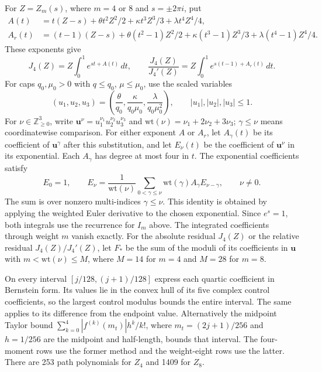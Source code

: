 \documentclass[11pt,reqno]{amsart}
\numberwithin{equation}{section}
\theoremstyle{definition}
\theoremstyle{remark}
\begin{document}
For $Z=Z_m(s)$, where $m=4$ or $8$ and $s=\pm2\pi i$, put
\begin{align*}
 A(t)&=t(Z-s)+\theta t^2 Z^2/2+\kappa t^3Z^3/3+\lambda t^4Z^4/4,\\
 A_r(t)&=(t-1)(Z-s)+\theta(t^2-1)Z^2/2
                  +\kappa(t^3-1)Z^3/3+\lambda(t^4-1)Z^4/4.
\end{align*}
These exponents give
\[
 J_4(Z)=Z\int_0^1e^{st+A(t)}\,dt,\qquad
 \frac{J_4(Z)}{J_4'(Z)}
 =Z\int_0^1e^{s(t-1)+A_r(t)}\,dt.
\]
For caps $q_0,\mu_0>0$ with $q\le q_0$, $\mu\le\mu_0$, use
the scaled variables
\[
 (u_1,u_2,u_3)=
 \left(\frac{\theta}{q_0},\frac{\kappa}{q_0\mu_0},
                         \frac{\lambda}{q_0\mu_0^2}\right),
 \qquad |u_1|,|u_2|,|u_3|\le1.
\]
For $\nu\in\mathbb Z_{\ge0}^3$, write
$\mathbf u^\nu=u_1^{\nu_1}u_2^{\nu_2}u_3^{\nu_3}$ and
$\mathrm{wt}(\nu)=\nu_1+2\nu_2+3\nu_3$; $\gamma\le\nu$ means
coordinatewise comparison. For either exponent $A$ or $A_r$, let
$A_\gamma(t)$ be its coefficient of $\mathbf u^\gamma$ after this
substitution, and let $E_\nu(t)$ be the coefficient of $\mathbf u^\nu$
in its exponential. Each $A_\gamma$ has degree at most four in $t$.
The exponential coefficients satisfy
\begin{equation}\label{lt:euler-recursion}
 E_0=1,\qquad
 E_\nu=\frac1{\mathrm{wt}(\nu)}
       \sum_{0<\gamma\le\nu}\mathrm{wt}(\gamma)A_\gamma E_{\nu-\gamma},
 \qquad \nu\ne0.
\end{equation}
The sum is over nonzero multi-indices $\gamma\le\nu$.
This identity is obtained by applying the weighted Euler derivative to
the chosen exponential. Since $e^s=1$, both integrals use the recurrence
for $I_m$ above. The integrated coefficients through weight $m$ vanish
exactly.
For the absolute residual $J_4(Z)$ or the relative residual
$J_4(Z)/J_4'(Z)$, let $F_*$ be the sum of the moduli of its
coefficients in $\mathbf u$ with $m<\mathrm{wt}(\nu)\le M$,
where $M=14$ for $m=4$ and $M=28$ for $m=8$.

On every interval
$[j/128,(j+1)/128]$ express each quartic coefficient in Bernstein
form. Its values lie in the convex hull of its five complex control
coefficients, so the largest control modulus bounds the entire
interval. The same applies to its difference from the endpoint value.
Alternatively the midpoint Taylor bound
$\sum_{k=0}^4|f^{(k)}(m_t)|h^k/k!$, where
$m_t=(2j+1)/256$ and $h=1/256$ are the midpoint and half-length,
bounds that interval. The four-moment rows use the former method and the
weight-eight rows use the latter. There are 253 path polynomials for
$Z_4$ and 1409 for $Z_8$.
\end{document}
